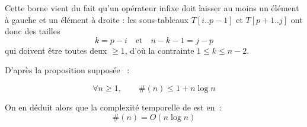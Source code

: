 Cette borne vient du fait qu’un opérateur infixe doit laisser au moins un 
élément à gauche et un élément à droite : les sous-tableaux $T[i..p-1]$ 
et $T[p+1..j]$ ont donc des tailles
\[
k = p-i \quad\text{et}\quad n-k-1 = j-p
\]
qui doivent être toutes deux $\ge 1$, d’où la contrainte 
$1 \le k \le n-2$.

D'après la proposition supposée~    :

\[
\forall n\ge 1,\qquad
\#(n) \le 1 + n\log n
\]

On en déduit alors que la complexité temporelle de  est en~:
\[
\#(n) = O(n \log n)
\]




